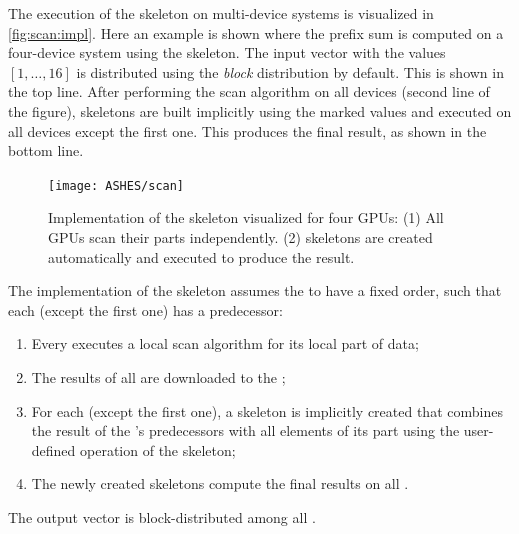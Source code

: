The execution of the \scan skeleton on multi-device systems is visualized in \autoref{fig:scan:impl}.
Here an example is shown where the prefix sum is computed on a four-device system using the \scan skeleton.
The input vector with the values $[1,\ldots,16]$ is distributed using the \emph{block} distribution by default.
This is shown in the top line.
After performing the scan algorithm on all devices (second line of the figure), \map skeletons are built implicitly using the marked values and executed on all devices except the first one.
This produces the final result, as shown in the bottom line.

\begin{figure}[tbp]
    \centering
    \texttt{[image: ASHES/scan]}
    \caption{Implementation of the \scan skeleton visualized for four GPUs:
            (1) All GPUs scan their parts independently.
            (2) \map skeletons are created automatically and
             executed to produce the result.}
    \label{fig:scan:impl}
\end{figure}

The \SkelCL implementation of the \scan skeleton assumes the \GPUs to have a fixed order, such that each \GPU (except the first one) has a predecessor:
\begin{enumerate}
 \item Every \GPU executes a local scan algorithm for its local part of data;
 \item The results of all \GPUs are downloaded to the \CPU;
 \item For each \GPU (except the first one), a \map skeleton is implicitly created that combines the result of the \GPU's predecessors with all elements of its part using the user-defined operation of the \scan skeleton;
 \item The newly created \map skeletons compute the final results on all \GPUs.
\end{enumerate}
The output vector is block-distributed among all \GPUs.





